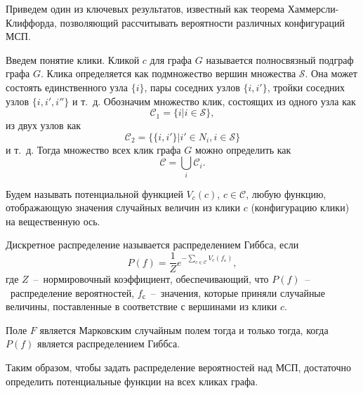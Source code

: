 Приведем один из ключевых результатов, известный как теорема Хаммерсли-Клиффорда, позволяющий рассчитывать вероятности различных конфигураций МСП.

Введем понятие клики. Кликой $c$ для графа $G$ называется полносвязный подграф графа $G$. Клика определяется как подмножество вершин множества $\mathcal{S}$. Она может состоять единственного узла $\{i\}$, пары соседних узлов $\{i,i'\}$, тройки соседних узлов $\{i,i',i''\}$ и т.~д. Обозначим множество клик, состоящих из одного узла как
\begin{equation*}
    \mathcal{C}_1 = \{ i \vert i \in \mathcal{S} \},
\end{equation*}
из двух узлов как
\begin{equation*}
    \mathcal{C}_2 = \{ \{i,i'\} \vert i' \in N_i, i \in \mathcal{S} \}
\end{equation*}
и т.~д. Тогда множество всех клик графа $G$ можно определить как
\begin{equation*}
    \mathcal{C} = \bigcup_i \mathcal{C}_i.
\end{equation*}

Будем называть потенциальной функцией $V_{c}(c)$, $c \in \mathcal{C}$, любую функцию, отображающую значения случайных величин из клики $c$ (конфигурацию клики) на вещественную ось.

\begin{definition}
    Дискретное распределение называется распределением Гиббса, если
    \begin{equation*}
        P(f) = \frac{1}{Z} e^{-\sum_{c \in \mathcal{C}}V_c(f_с)},
    \end{equation*}
    где $Z$~--~нормировочный коэффициент, обеспечивающий, что $P(f)$~--~распределение вероятностей, $f_с$~--~значения, которые приняли случайные величины, поставленные в соответствие с вершинами из клики $c$.
\end{definition}

\begin{theoremapp}
    Поле $F$ является Марковским случайным полем тогда и только тогда, когда $P(f)$ является распределением Гиббса.
\end{theoremapp}

Таким образом, чтобы задать распределение вероятностей над МСП, достаточно определить потенциальные функции на всех кликах графа.